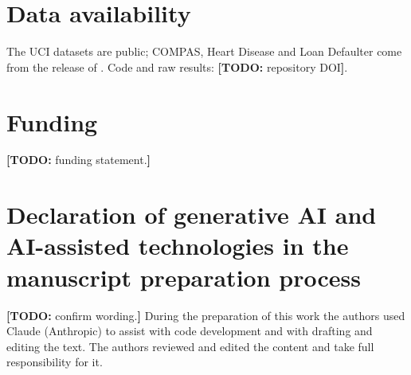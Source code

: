 \documentclass[preprint,12pt,authoryear]{elsarticle}
\newcommand{\todo}[1]{\textcolor{red!70!black}{\textbf{[TODO:} #1\textbf{]}}}
\begin{document}
\section*{Data availability}
The UCI datasets are public; COMPAS, Heart Disease and Loan Defaulter come from the release of \citet{Runje2023}. Code
and raw results: \todo{repository DOI}.

\section*{Funding}
\todo{funding statement.}

\section*{Declaration of generative AI and AI-assisted technologies in the manuscript preparation process}
\todo{confirm wording.} During the preparation of this work the authors used Claude (Anthropic) to assist with code development and with
drafting and editing the text. The authors reviewed and edited the content and take full responsibility for it.



\end{document}

